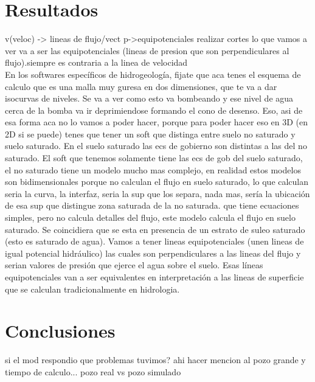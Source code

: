 \documentclass[10pt,a4paper,final]{article}
\begin{document}
\section{Resultados}
v(veloc) -> lineas de flujo/vect
p->equipotenciales
realizar cortes
lo que vamos a ver va a ser las equipotenciales (lineas de presion que son perpendiculares al flujo).siempre es contraria a la linea de velocidad\\
En los softwares específicos de hidrogeología, fijate que aca tenes el esquema de calculo que es una malla muy guresa en dos dimensiones, que te va a dar isocurvas de niveles. Se va a ver como esto va bombeando y ese nivel de agua cerca de la bomba va ir deprimiendose formando el cono de desenso. Eso, asi de esa forma aca no lo vamos a poder hacer, porque para poder hacer eso en 3D (en 2D si se puede) tenes que tener un soft que distinga entre suelo no saturado y suelo saturado. En el suelo saturado las ecs de gobierno son distintas a las del no saturado. El soft que tenemos solamente tiene las ecs de gob del suelo saturado, el no saturado tiene un modelo mucho mas complejo, en realidad estos modelos son bidimensionales porque no calculan el flujo en suelo saturado, lo que calculan seria la curva, la interfaz, seria la sup que los separa, nada mas, sería la ubicación de esa sup que distingue zona saturada de la no saturada. que tiene ecuaciones simples, pero no calcula detalles del flujo, este modelo calcula el flujo en suelo saturado. 
Se coincidiera que se esta en presencia de un estrato de suleo saturado (esto es saturado de agua). 
Vamos a tener lineas equipotenciales (unen lineas de igual potencial hidráulico) las cuales son perpendiculares a las lineas del flujo y serian valores de presión que ejerce el agua sobre el suelo. Esas líneas equipotenciales van a ser equivalentes en interpretación a las lineas de superficie que se calculan tradicionalmente en hidrologia.
\section{Conclusiones}
si el mod respondio
que problemas tuvimos? ahi hacer mencion al pozo grande y tiempo de calculo...
pozo real vs pozo simulado
\end{document}
